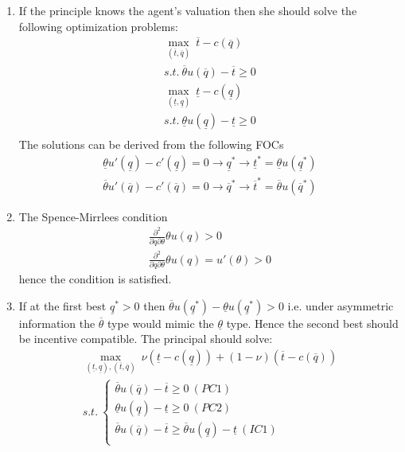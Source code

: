 \documentclass[a4paper]{article}
\newcommand{\ubar}{\overline}
\newcommand{\lbar}{\underline}
\begin{document}
\begin{enumerate}
	\item If the principle knows the agent's valuation then she should solve the following optimization problems:
	\begin{align*}
	\underset{(\overline{t}, \overline{q})}{\max}\ \overline{t} - c(\overline{q})\\
	s.t.\ \overline{\theta} u(\overline{q}) - \overline{t} \ge 0\\
	\underset{(\underline{t}, \underline{q})}{\max}\ \underline{t} - c(\underline{q})\\
	s.t.\ \underline{\theta} u(\underline{q}) - \underline{t} \ge 0\\
	\end{align*}
	The solutions can be derived from the following FOCs
	\begin{align*}
	\underline{\theta} u'(\underline{q}) - c'(\underline{q}) = 0 \to \underline{q}^* \to \underline{t}^* = \underline{\theta}u(\underline{q}^*)\\
	\overline{\theta} u'(\overline{q}) - c'(\overline{q}) = 0 \to \overline{q}^* \to \overline{t}^* = \overline{\theta}u(\overline{q}^*)
	\end{align*}
	\item The Spence-Mirrlees condition
	\begin{align*}
	\frac{\partial ^2}{\partial q \partial \theta} \theta u(q) > 0\\
	\frac{\partial ^2}{\partial q \partial \theta} \theta u(q) = u'(\theta) > 0
	\end{align*}
	hence the condition is satisfied.
	\item If at the first best $\underline{q}^* > 0$ then $\overline{\theta} u(\underline{q}^*) - \underline{\theta}u(\underline{q}^*) > 0$ i.e. under asymmetric information the $\ubar{\theta}$ type would mimic the $\lbar{\theta}$ type. Hence the second best should be incentive compatible. The principal should solve:
	\begin{align*}
	\underset{(\underline{t}, \underline{q}), (\overline{t}, \overline{q})}{\max}\ \nu(\underline{t} - c(\underline{q})) + (1 - \nu)(\overline{t} - c(\overline{q}))\\
	s.t.\ \begin{cases}
	\overline{\theta} u(\overline{q}) - \overline{t} \ge 0\ (PC1)\\
	\underline{\theta} u(\underline{q}) - \underline{t} \ge 0\ (PC2)\\
	\overline{\theta} u(\overline{q}) - \overline{t} \ge \overline{\theta} u(\underline{q}) - \underline{t}\ (IC1)\\

\end{cases}
\end{align*}
\end{enumerate}
\end{document}
